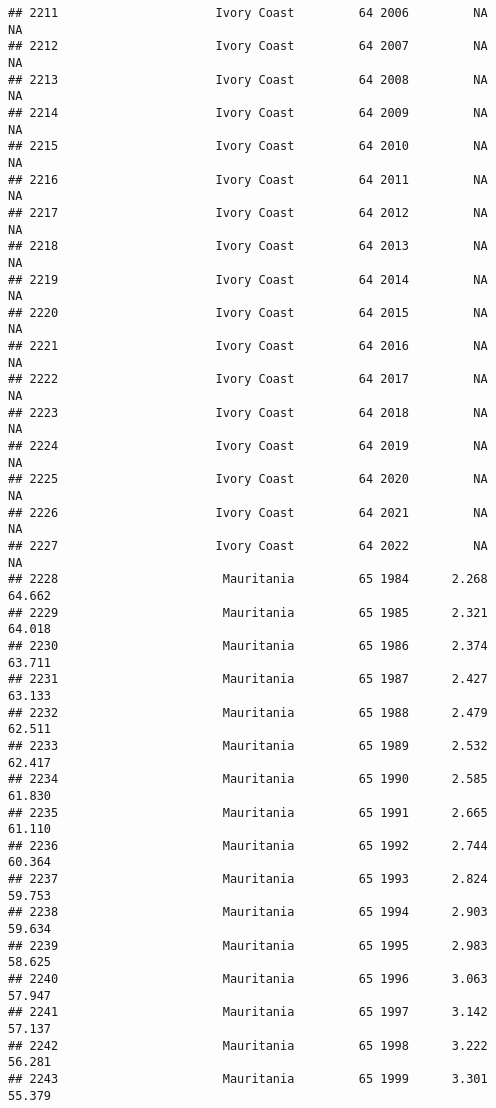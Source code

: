 \documentclass[
]{article}
\begin{document}
\begin{verbatim}
## 2211                      Ivory Coast         64 2006         NA         NA
## 2212                      Ivory Coast         64 2007         NA         NA
## 2213                      Ivory Coast         64 2008         NA         NA
## 2214                      Ivory Coast         64 2009         NA         NA
## 2215                      Ivory Coast         64 2010         NA         NA
## 2216                      Ivory Coast         64 2011         NA         NA
## 2217                      Ivory Coast         64 2012         NA         NA
## 2218                      Ivory Coast         64 2013         NA         NA
## 2219                      Ivory Coast         64 2014         NA         NA
## 2220                      Ivory Coast         64 2015         NA         NA
## 2221                      Ivory Coast         64 2016         NA         NA
## 2222                      Ivory Coast         64 2017         NA         NA
## 2223                      Ivory Coast         64 2018         NA         NA
## 2224                      Ivory Coast         64 2019         NA         NA
## 2225                      Ivory Coast         64 2020         NA         NA
## 2226                      Ivory Coast         64 2021         NA         NA
## 2227                      Ivory Coast         64 2022         NA         NA
## 2228                       Mauritania         65 1984      2.268     64.662
## 2229                       Mauritania         65 1985      2.321     64.018
## 2230                       Mauritania         65 1986      2.374     63.711
## 2231                       Mauritania         65 1987      2.427     63.133
## 2232                       Mauritania         65 1988      2.479     62.511
## 2233                       Mauritania         65 1989      2.532     62.417
## 2234                       Mauritania         65 1990      2.585     61.830
## 2235                       Mauritania         65 1991      2.665     61.110
## 2236                       Mauritania         65 1992      2.744     60.364
## 2237                       Mauritania         65 1993      2.824     59.753
## 2238                       Mauritania         65 1994      2.903     59.634
## 2239                       Mauritania         65 1995      2.983     58.625
## 2240                       Mauritania         65 1996      3.063     57.947
## 2241                       Mauritania         65 1997      3.142     57.137
## 2242                       Mauritania         65 1998      3.222     56.281
## 2243                       Mauritania         65 1999      3.301     55.379

\end{verbatim}
\end{document}

